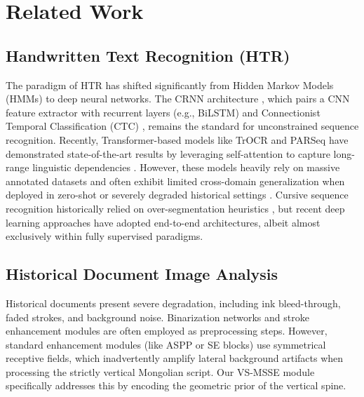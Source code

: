 \documentclass[11pt]{article}
\begin{document}
\section{Related Work}

\subsection{Handwritten Text Recognition (HTR)}
The paradigm of HTR has shifted significantly from Hidden Markov Models (HMMs) \cite{marti2001using} to deep neural networks. The CRNN architecture \cite{shi2016end}, which pairs a CNN feature extractor with recurrent layers (e.g., BiLSTM) and Connectionist Temporal Classification (CTC) \cite{graves2006connectionist}, remains the standard for unconstrained sequence recognition. Recently, Transformer-based models like TrOCR \cite{li2021trocr} and PARSeq \cite{bautista2022parseq} have demonstrated state-of-the-art results by leveraging self-attention to capture long-range linguistic dependencies \cite{kang2022pay, souibgui2022few}. However, these models heavily rely on massive annotated datasets and often exhibit limited cross-domain generalization when deployed in zero-shot or severely degraded historical settings \cite{coquenet2023dan}. Cursive sequence recognition historically relied on over-segmentation heuristics \cite{marti2001using}, but recent deep learning approaches \cite{shi2018aster, bhunia2021meta} have adopted end-to-end architectures, albeit almost exclusively within fully supervised paradigms.

\subsection{Historical Document Image Analysis}
Historical documents present severe degradation, including ink bleed-through, faded strokes, and background noise. Binarization networks \cite{kang2020complex} and stroke enhancement modules \cite{tensmeyer2017document} are often employed as preprocessing steps. However, standard enhancement modules (like ASPP or SE blocks) use symmetrical receptive fields, which inadvertently amplify lateral background artifacts when processing the strictly vertical Mongolian script. Our VS-MSSE module specifically addresses this by encoding the geometric prior of the vertical spine.
\end{document}
